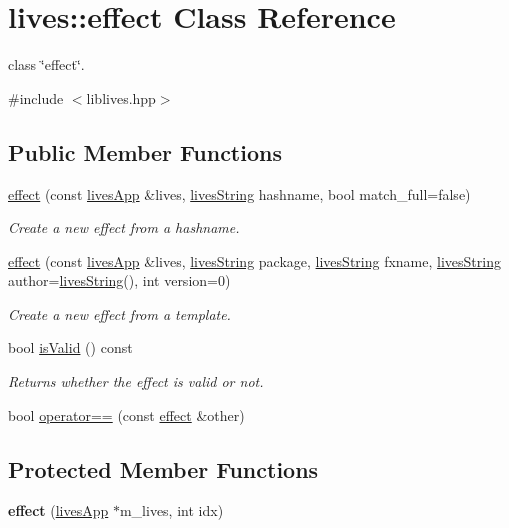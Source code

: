 \hypertarget{classlives_1_1effect}{\section{lives\-:\-:effect Class Reference}
\label{classlives_1_1effect}
}


class \char`\"{}effect\char`\"{}.  




{\ttfamily \#include $<$liblives.\-hpp$>$}

\subsection*{Public Member Functions}
\begin{DoxyCompactItemize}
\item 
\hyperlink{classlives_1_1effect_ace6524509145367bc5c6121810548bc0}{effect} (const \hyperlink{classlives_1_1livesApp}{lives\-App} \&lives, \hyperlink{classlives_1_1livesString}{lives\-String} hashname, bool match\-\_\-full=false)
\begin{DoxyCompactList}\small\item\em Create a new effect from a hashname. \end{DoxyCompactList}\item 
\hyperlink{classlives_1_1effect_a87c540b1cf94ddf2eea2672845f9c088}{effect} (const \hyperlink{classlives_1_1livesApp}{lives\-App} \&lives, \hyperlink{classlives_1_1livesString}{lives\-String} package, \hyperlink{classlives_1_1livesString}{lives\-String} fxname, \hyperlink{classlives_1_1livesString}{lives\-String} author=\hyperlink{classlives_1_1livesString}{lives\-String}(), int version=0)
\begin{DoxyCompactList}\small\item\em Create a new effect from a template. \end{DoxyCompactList}\item 
bool \hyperlink{classlives_1_1effect_ab3e178872c8df2febc0f4ced0da6bdf0}{is\-Valid} () const 
\begin{DoxyCompactList}\small\item\em Returns whether the effect is valid or not. \end{DoxyCompactList}\item 
bool \hyperlink{classlives_1_1effect_a53275ad671be9ccb33acbf5e097f2c32}{operator==} (const \hyperlink{classlives_1_1effect}{effect} \&other)
\end{DoxyCompactItemize}
\subsection*{Protected Member Functions}
\begin{DoxyCompactItemize}
\item 
\hypertarget{classlives_1_1effect_a88929d677ffd2738faa78a53a92c4bb8}{{\bfseries effect} (\hyperlink{classlives_1_1livesApp}{lives\-App} $\ast$m\-\_\-lives, int idx)}\label{classlives_1_1effect_a88929d677ffd2738faa78a53a92c4bb8}

\end{DoxyCompactItemize}
